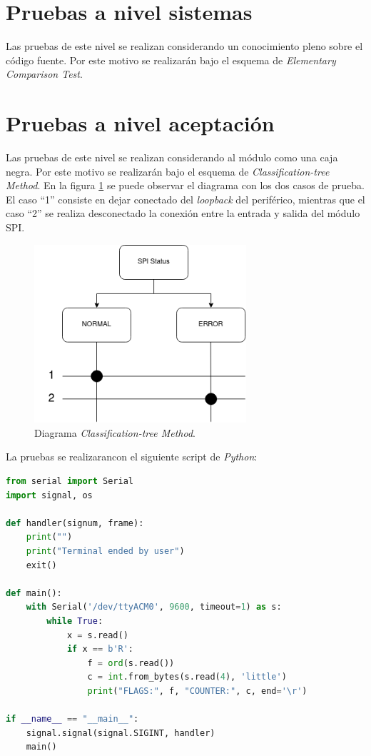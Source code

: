\documentclass[
    11pt,
    spanish,
	a4paper
]{article}
\begin{document}
\section{Pruebas a nivel sistemas}
\label{sec:lvlsistema}

Las pruebas de este nivel se realizan considerando un conocimiento pleno sobre el código fuente.
Por este motivo se realizarán bajo el esquema de \emph{Elementary Comparison Test}.


\section{Pruebas a nivel aceptación}
\label{sec:lvlaceptacion}

Las pruebas de este nivel se realizan considerando al módulo como una caja negra.
Por este motivo se realizarán bajo el esquema de \emph{Classification-tree Method}.
En la figura \ref{fig:ctm} se puede observar el diagrama con los dos casos de prueba.
El caso ``1'' consiste en dejar conectado del \emph{loopback} del periférico, mientras que el caso ``2'' se realiza desconectado la conexión entre la entrada y salida del módulo SPI.

\begin{figure}[h!]
	\centering
	\includegraphics[width=0.7\textwidth]{./img/ctm.png}
    \caption{Diagrama \emph{Classification-tree Method}.}
	\label{fig:ctm}
\end{figure}

\newpage
La pruebas se realizarancon el siguiente script de \emph{Python}:

\begin{lstlisting}[language=Python]
from serial import Serial
import signal, os

def handler(signum, frame):
    print("")
    print("Terminal ended by user")
    exit()

def main():
    with Serial('/dev/ttyACM0', 9600, timeout=1) as s:
        while True:
            x = s.read()
            if x == b'R':
                f = ord(s.read())
                c = int.from_bytes(s.read(4), 'little')
                print("FLAGS:", f, "COUNTER:", c, end='\r')

if __name__ == "__main__":
    signal.signal(signal.SIGINT, handler)
    main()
\end{lstlisting}
\end{document}
